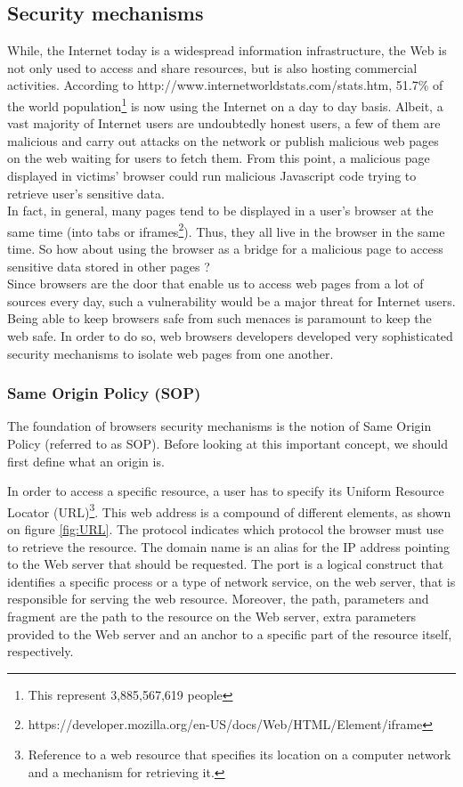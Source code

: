 \documentclass[journal]{IEEEtran}
\begin{document}
\subsection{Security mechanisms}
While, the Internet today is a widespread information infrastructure, the Web is not only used to access and share resources, but is also hosting commercial activities. According to http://www.internetworldstats.com/stats.htm, 51.7\% of the world population\footnote{This represent 3,885,567,619 people} is now using the Internet on a day to day basis. Albeit, a vast majority of Internet users are undoubtedly honest users, a few of them are malicious and carry out attacks on the network or publish malicious web pages on the web waiting for users to fetch them. From this point, a malicious page displayed in victims' browser could run malicious Javascript code trying to retrieve user's sensitive data. \\
In fact, in general, many pages tend to be displayed in a user's browser at the same time (into tabs or iframes\footnote{https://developer.mozilla.org/en-US/docs/Web/HTML/Element/iframe}). Thus, they all live in the browser in the same time. So how about using the browser as a bridge for a malicious page to access sensitive data stored in other pages ? \\

Since browsers are the door that enable us to access web pages from a lot of sources every day, such a vulnerability would be a major threat for Internet users. Being able to keep browsers safe from such menaces is paramount to keep the web safe. In order to do so, web browsers developers developed very sophisticated security mechanisms to isolate web pages from one another.

\medskip

\subsubsection{Same Origin Policy (SOP)}

The foundation of browsers security mechanisms is the notion of Same Origin Policy (referred to as SOP). Before looking at this important concept, we should first define what an origin is.

\medskip

In order to access a specific resource, a user has to specify its Uniform Resource Locator (URL)\footnote{Reference to a web resource that specifies its location on a computer network and a mechanism for retrieving it.}. This web address is a compound of different elements, as shown on figure \ref{fig:URL}. The protocol indicates which protocol the browser must use to retrieve the resource. The domain name is an alias for the IP address pointing to the Web server that should be requested. The port is a logical construct that identifies a specific process or a type of network service, on the web server, that is responsible for serving the web resource. Moreover, the path, parameters and fragment are the path to the resource on the Web server, extra parameters provided to the Web server and an anchor to a specific part of the resource itself, respectively.
\end{document}
